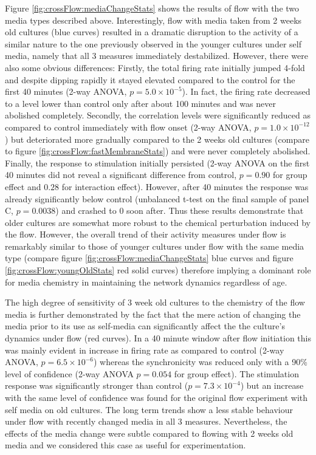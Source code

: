         Figure \ref{fig:crossFlow:mediaChangeStats} shows the results of flow with the two media types described above. Interestingly, flow with media taken from 2 weeks old cultures (blue curves) resulted in a dramatic disruption to the activity of a similar nature to the one previously observed in the younger cultures under self media, namely that all 3 measures immediately destabilized. However, there were also some obvious differences: Firstly, the total firing rate initially jumped 4-fold and despite dipping rapidly it stayed elevated compared to the control for the first 40 minutes (2-way ANOVA, \(p=5.0\times 10^{-5}\)). In fact, the firing rate decreased to a level lower than control only after about 100 minutes and was never abolished completely. Secondly, the correlation levels were significantly reduced as compared to control immediately with flow onset (2-way ANOVA, \(p=1.0\times 10^{-12}\)) but deteriorated more gradually compared to the 2 weeks old cultures (compare to figure \ref{fig:crossFlow:fastMembraneStats}) and were never completely abolished. Finally, the response to stimulation initially persisted (2-way ANOVA on the first 40 minutes did not reveal a significant difference from control, \(p=0.90\) for group effect and \(0.28\) for interaction effect). However, after 40 minutes the response was already significantly below control (unbalanced t-test on the final sample of panel C, \(p=0.0038\)) and crashed to 0 soon after. Thus these results demonstrate that older cultures are somewhat more robust to the chemical perturbation induced by the flow. However, the overall trend of their activity measures under flow is remarkably similar to those of younger cultures under flow with the same media type (compare figure \ref{fig:crossFlow:mediaChangeStats} blue curves and figure \ref{fig:crossFlow:youngOldStats} red solid curves) therefore implying a dominant role for media chemistry in maintaining the network dynamics regardless of age.

        The high degree of sensitivity of 3 week old cultures to the chemistry of the flow media is further demonstrated by the fact that the mere action of changing the media prior to its use as self-media can significantly affect the the culture's dynamics under flow (red curves). In a 40 minute window after flow initiation this was mainly evident in increase in firing rate as compared to control (2-way ANOVA, \(p=6.5\times 10^{-6}\)) whereas the synchronicity was reduced only with a 90\% level of confidence (2-way ANOVA \(p=0.054\) for group effect). The stimulation response was significantly stronger than control (\(p=7.3\times 10^{-4}\)) but an increase with the same level of confidence was found for the original flow experiment with self media on old cultures. The long term trends show a less stable behaviour under flow with recently changed media in all 3 measures. Nevertheless, the effects of the media change were subtle compared to flowing with 2 weeks old media and we considered this case as useful for experimentation.

